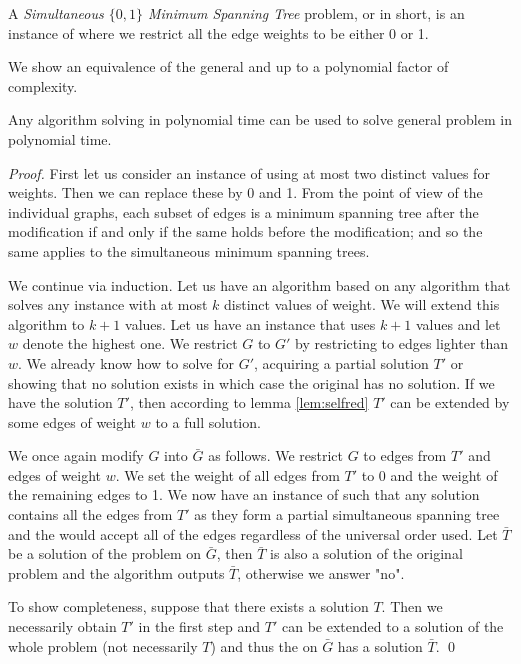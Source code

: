 \begin{definition}
A {\em Simultaneous $\{0,1\}$ Minimum Spanning Tree} problem, or \OISMST in short, is an instance of \SMST where we restrict all the edge weights to be either 0 or 1. 
\end{definition}

We show an equivalence of the general \SMST and \OISMST up to a polynomial factor of complexity. 
\begin{lemma}\label{lem:01reduction}
Any algorithm solving \OISMST in polynomial time can be used to solve general \SMST problem in polynomial time. 
\end{lemma}
\begin{proof} 
First let us consider an instance of \SMST using at most two distinct values for weights. Then we can replace these by 0 and 1. From the point of view of the individual graphs, each subset of edges is a minimum spanning tree after the modification if and only if the same holds before the modification; and so the same applies to the simultaneous minimum spanning trees. 

We continue via induction. Let us have an algorithm based on any \OISMST algorithm that solves any \SMST instance with at most $k$ distinct values of weight. We will extend this algorithm to $k+1$ values. Let us have an instance that uses $k+1$ values and let $w$ denote the highest one. We restrict $G$ to $G'$ by restricting to edges lighter than $w$. We already know how to solve \SMST for $G'$, acquiring a partial solution $T'$ or showing that no solution exists in which case the original \SMST has no solution. If we have the solution $T'$, then according to lemma \ref{lem:selfred} $T'$ can be extended by some edges of weight $w$ to a full solution. 

We once again modify $G$ into $\bar{G}$ as follows. We restrict $G$ to edges from $T'$ and edges of weight $w$. We set the weight of all edges from $T'$ to 0 and the weight of the remaining edges to 1. We now have an instance of \OISMST such that any solution contains all the edges from $T'$ as they form a partial simultaneous spanning tree and the \SKA would accept all of the edges regardless of the universal order used. Let $\bar{T}$ be a solution of the \OISMST problem on $\bar{G}$, then $\bar{T}$ is also a solution of the original \SMST problem and the algorithm outputs $\bar{T}$, otherwise we answer "no". 

To show completeness, suppose that there exists a solution $T$. Then we necessarily obtain $T'$ in the first step and $T'$ can be extended to a solution of the whole problem (not necessarily $T$) and thus the \OISMST on $\bar{G}$ has a solution $\bar{T}$. \qed
\end{proof}

